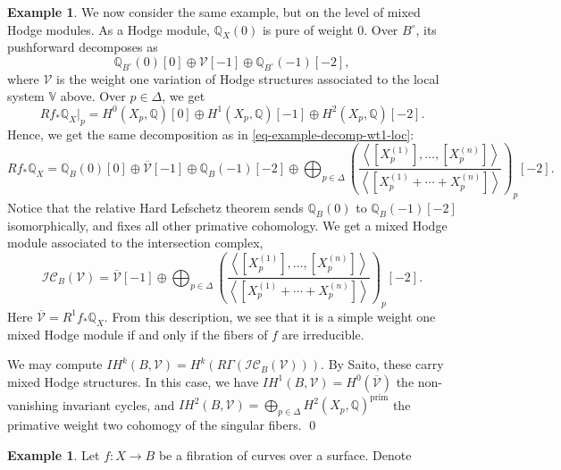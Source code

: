 \documentclass[12pt]{amsart}
\newcommand{\Q}{\mathbb{Q}}
\newcommand{\ol}{\overline}
\theoremstyle{definition}
\newtheorem{example}[theorem]{Example}
\theoremstyle{remark}
\numberwithin{equation}{section}
\begin{document}
\begin{example}
We now consider the same example, but on the level of mixed Hodge modules. As a Hodge
module, \(\Q_X(0)\) is pure of weight 0. Over \(B^\circ\), its pushforward 
decomposes as 
\begin{equation}
    \Q_{B^\circ}(0)[0] \oplus \mathcal{V}[-1] \oplus \Q_{B^\circ}(-1)[-2],
\end{equation}
where \(\mathcal{V}\) is the weight one variation of Hodge structures associated to the 
local system \(\mathbb{V}\) above. Over \(p \in \Delta\), we get 
\begin{equation}
    Rf_* \Q_X|_p = H^0(X_p, \Q)[0] \oplus H^1(X_p, \Q)[-1] \oplus H^2(X_p, \Q)[-2].
\end{equation}
Hence, we get the same decomposition as in \eqref{eq-example-decomp-wt1-loc}: 
\begin{equation}
   Rf_* \Q_X = \Q_B(0)[0] \oplus \ol{\mathcal{V}}[-1] \oplus \Q_B(-1)[-2] \oplus
   \bigoplus_{p \in \Delta} \left(\frac{\left<[X_p^{(1)}], \dots, [X_p^{(n)}]\right>}
   {\left<[X_p^{(1)} + \cdots + X_p^{(n)}]\right>}\right)_p[-2].
\end{equation}
Notice that the relative Hard Lefschetz theorem sends \(\Q_B(0)\) to \(\Q_B(-1)[-2]\)
isomorphically, and fixes all other primative cohomology. We get a mixed Hodge module 
associated to the intersection complex, 
\begin{equation}
    \mathscr{IC}_B(\mathcal{V}) = \ol{\mathcal{V}}[-1] \oplus 
    \bigoplus_{p \in \Delta} \left(\frac{\left<[X_p^{(1)}], \dots, [X_p^{(n)}]\right>}
   {\left<[X_p^{(1)} + \cdots + X_p^{(n)}]\right>}\right)_p[-2].
\end{equation}
Here \(\ol{\mathcal{V}} = R^1 f_* \Q_X\). From this description, we see that it is a
simple weight one mixed Hodge module if and only if the fibers of \(f\) are irreducible.

We may compute \(IH^k(B, \mathcal{V}) = H^k(R \Gamma(\mathscr{IC}_B(\mathcal{V})))\).
By Saito, these carry mixed Hodge structures. In this case, we have 
\(IH^1(B, \mathcal{V}) = H^0(\ol{\mathcal{V}})\) the non-vanishing invariant cycles, and
\(IH^2(B, \mathcal{V}) = \bigoplus_{p \in \Delta} H^2(X_p, \Q)^{\mathrm{prim}}\)
the primative weight two cohomogy of the singular fibers.
\qed
\end{example}


\begin{example}
Let \(f: X \to B\) be a fibration of curves over a surface. Denote 

\end{example}
\end{document}

